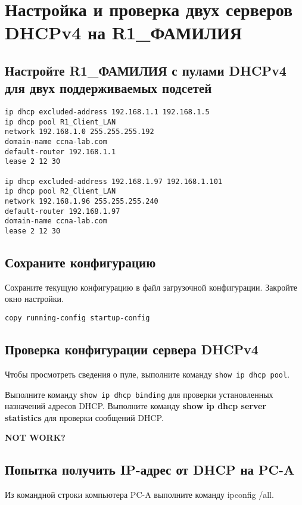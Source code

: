 \section{Настройка и проверка двух серверов DHCPv4 на R1\_ФАМИЛИЯ}

\subsection{Настройте R1\_ФАМИЛИЯ с пулами DHCPv4
для двух поддерживаемых подсетей}

\begin{verbatim}
ip dhcp excluded-address 192.168.1.1 192.168.1.5
ip dhcp pool R1_Client_LAN
network 192.168.1.0 255.255.255.192
domain-name ccna-lab.com
default-router 192.168.1.1
lease 2 12 30

ip dhcp excluded-address 192.168.1.97 192.168.1.101
ip dhcp pool R2_Client_LAN
network 192.168.1.96 255.255.255.240
default-router 192.168.1.97
domain-name ccna-lab.com
lease 2 12 30
\end{verbatim}

\subsection{Сохраните конфигурацию}
Сохраните текущую конфигурацию в файл загрузочной конфигурации.
Закройте окно настройки.

\begin{verbatim}
copy running-config startup-config
\end{verbatim}

\subsection{Проверка конфигурации сервера DHCPv4}

Чтобы просмотреть сведения о пуле,
выполните команду \texttt{show ip dhcp pool}.

Выполните команду \texttt{show ip dhcp binding}
для проверки установленных назначений адресов DHCP.
Выполните команду \textbf{show ip dhcp server statistics}
для проверки сообщений DHCP.

\textbf{NOT WORK?}

\subsection{Попытка получить IP-адрес от DHCP на PC-A}

Из командной строки компьютера PC-A выполните команду ipconfig /all.

